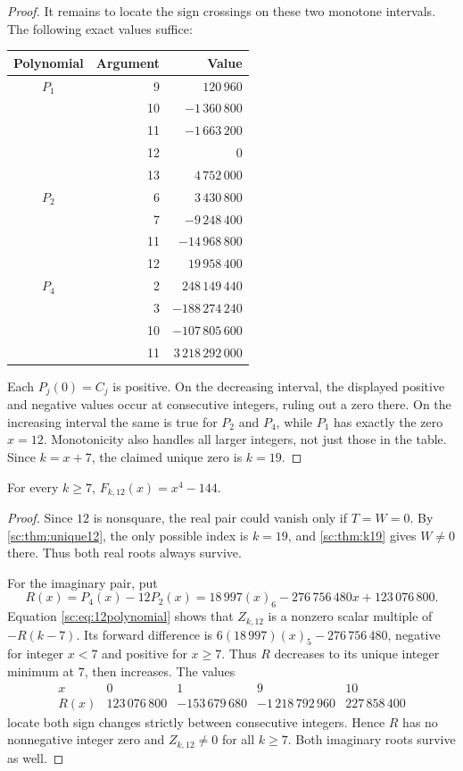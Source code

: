 \documentclass[11pt,a4paper]{article}
\numberwithin{equation}{section}
\theoremstyle{definition}
\theoremstyle{remark}
\newcommand{\fall}[2]{(#1)_{#2}}
\begin{document}
\begin{proof}
It remains to locate the sign crossings on these two monotone intervals.
The following exact values suffice:
\begin{center}
\small
\begin{tabular}{@{}crr@{}}
\toprule
Polynomial&Argument&Value\\\midrule
$P_1$&9&$120\,960$\\
&10&$-1\,360\,800$\\
&11&$-1\,663\,200$\\
&12&$0$\\
&13&$4\,752\,000$\\\midrule
$P_2$&6&$3\,430\,800$\\
&7&$-9\,248\,400$\\
&11&$-14\,968\,800$\\
&12&$19\,958\,400$\\\midrule
$P_4$&2&$248\,149\,440$\\
&3&$-188\,274\,240$\\
&10&$-107\,805\,600$\\
&11&$3\,218\,292\,000$\\\bottomrule
\end{tabular}
\end{center}
Each $P_j(0)=C_j$ is positive. On the decreasing interval, the displayed
positive and negative values occur at consecutive integers, ruling out a
zero there. On the increasing interval the same is true for $P_2$ and
$P_4$, while $P_1$ has exactly the zero $x=12$. Monotonicity also handles
all larger integers, not just those in the table. Since $k=x+7$, the
claimed unique zero is $k=19$.
\end{proof}

\begin{corollary}\label{sc:cor:12full}
For every $k\ge7$, $F_{k,12}(x)=x^4-144$.
\end{corollary}
\begin{proof}
Since $12$ is nonsquare, the real pair could vanish only if $T=W=0$.
By \cref{sc:thm:unique12}, the only possible index is $k=19$, and
\cref{sc:thm:k19} gives $W\ne0$ there. Thus both real roots always survive.

For the imaginary pair, put
\[
 R(x)=P_4(x)-12P_2(x)
      =18\,997\fall x6-276\,756\,480x+123\,076\,800.
\]
Equation \eqref{sc:eq:12polynomial} shows that $Z_{k,12}$ is a nonzero
scalar multiple of $-R(k-7)$. Its forward difference is
$6(18\,997)\fall x5-276\,756\,480$, negative for integer $x<7$
and positive for $x\ge7$. Thus $R$ decreases to its unique integer
minimum at $7$, then increases. The values
\[
\begin{array}{c|rrrr}
x&0&1&9&10\\\hline
R(x)&123\,076\,800&-153\,679\,680&-1\,218\,792\,960&227\,858\,400
\end{array}
\]
locate both sign changes strictly between consecutive integers. Hence
$R$ has no nonnegative integer zero and $Z_{k,12}\ne0$ for all $k\ge7$.
Both imaginary roots survive as well.
\end{proof}
\end{document}
